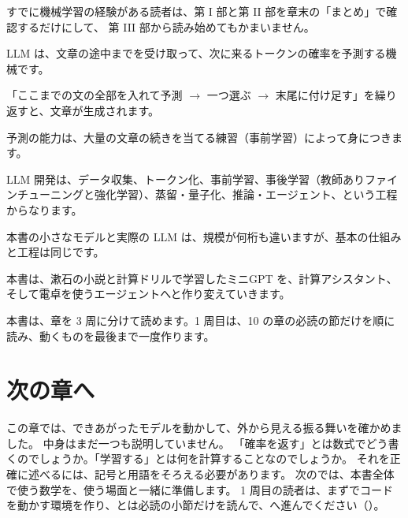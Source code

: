 すでに機械学習の経験がある読者は、第 I 部と第 II 部を章末の「まとめ」で確認するだけにして、
第 III 部から読み始めてもかまいません。

\begin{summary}
\item LLM は、文章の途中までを受け取って、次に来るトークンの確率を予測する機械です。
\item 「ここまでの文の全部を入れて予測 $\to$ 一つ選ぶ $\to$ 末尾に付け足す」を繰り返すと、文章が生成されます。
\item 予測の能力は、大量の文章の続きを当てる練習（事前学習）によって身につきます。
\item LLM 開発は、データ収集、トークン化、事前学習、事後学習（教師ありファインチューニングと強化学習）、蒸留・量子化、推論・エージェント、という工程からなります。
\item 本書の小さなモデルと実際の LLM は、規模が何桁も違いますが、基本の仕組みと工程は同じです。
\item 本書は、漱石の小説と計算ドリルで学習したミニGPT を、計算アシスタント、そして電卓を使うエージェントへと作り変えていきます。
\item 本書は、章を 3 周に分けて読めます。1 周目は、10 の章の必読の節だけを順に読み、動くものを最後まで一度作ります。
\end{summary}

\section*{次の章へ}

この章では、できあがったモデルを動かして、外から見える振る舞いを確かめました。
中身はまだ一つも説明していません。
「確率を返す」とは数式でどう書くのでしょうか。「学習する」とは何を計算することなのでしょうか。
それを正確に述べるには、記号と用語をそろえる必要があります。
次のでは、本書全体で使う数学を、使う場面と一緒に準備します。
1 周目の読者は、まずでコードを動かす環境を作り、とは必読の小節だけを読んで、へ進んでください（）。
